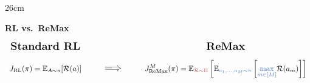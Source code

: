 \documentclass[border=10pt]{standalone}
\begin{document}
\begin{varwidth}{26cm}

\begin{center}
{\Huge\bfseries RL vs.\ ReMax}
\end{center}

\vspace{0.8em}

\vspace{1.2em}

\[
\begin{array}{c@{\hspace{3em}}c@{\hspace{3em}}c}
\text{\Large\bfseries Standard RL}
&
&
\text{\Large\bfseries ReMax}
\\[1.0em]
\displaystyle
J_{\mathrm{RL}}(\pi)
=
\mathbb{E}_{A\sim\pi}[\mathcal{R}(a)]
&
\text{\Large\color{softgray}$\Longrightarrow$}
&
\displaystyle
J_{\mathrm{ReMax}}^M(\pi)
=
\mathbb{E}_{\textcolor{softred}{\mathcal{R}\sim\Pi}}
\left[
\mathbb{E}_{\textcolor{softblue}{a_1,\ldots,a_M\sim\pi}}
\left[
\textcolor{softblue}{\max_{m\in[M]}} \mathcal{R}(a_m)
\right]
\right]
\end{array}
\]

\end{varwidth}
\end{document}
